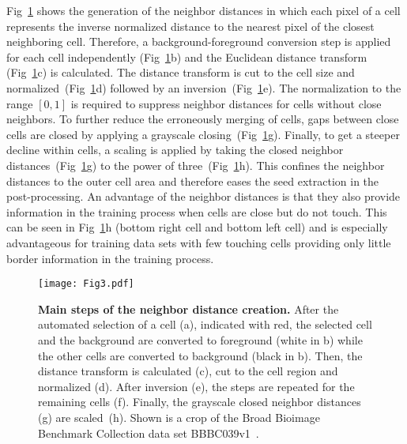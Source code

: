\documentclass[10pt,letterpaper]{article}
\begin{document}
Fig~\ref{fig:label-creation} shows the generation of the neighbor distances in which each pixel of a cell represents the inverse normalized distance to the nearest pixel of the closest neighboring cell. Therefore, a background-foreground conversion step is applied for each cell independently (Fig~\ref{fig:label-creation}b) and the Euclidean distance transform (Fig~\ref{fig:label-creation}c) is calculated. The distance transform is cut to the cell size and normalized~(Fig~\ref{fig:label-creation}d) followed by an inversion~(Fig~\ref{fig:label-creation}e). The normalization to the range $[0,1]$ is required to suppress neighbor distances for cells without close neighbors. To further reduce the erroneously merging of cells, gaps between close cells are closed by applying a grayscale closing~(Fig~\ref{fig:label-creation}g). Finally, to get a steeper decline within cells, a scaling is applied by taking the closed neighbor distances~(Fig~\ref{fig:label-creation}g) to the power of three~(Fig~\ref{fig:label-creation}h). This confines the neighbor distances to the outer cell area and therefore eases the seed extraction in the post-processing. An advantage of the neighbor distances is that they also provide information in the training process when cells are close but do not touch. This can be seen in Fig~\ref{fig:label-creation}h (bottom right cell and bottom left cell) and is especially advantageous for training data sets with few touching cells providing only little border information in the training process.
\begin{figure}
\begin{adjustwidth}{-2.25in}{0in}
\centering
\texttt{[image: Fig3.pdf]}
\caption{\textbf{Main steps of the neighbor distance creation.} After the automated selection of a cell (a), indicated with red, the selected cell and the background are converted to foreground (white in b) while the other cells are converted to background (black in b). Then, the distance transform is calculated (c), cut to the cell region and normalized (d). After inversion (e), the steps are repeated for the remaining cells (f). Finally, the grayscale closed neighbor distances (g) are scaled~(h). Shown is a crop of the Broad Bioimage Benchmark Collection data set BBBC039v1~\cite{Ljosa2012}.}
\label{fig:label-creation}
\end{adjustwidth}
\end{figure}
\end{document}
